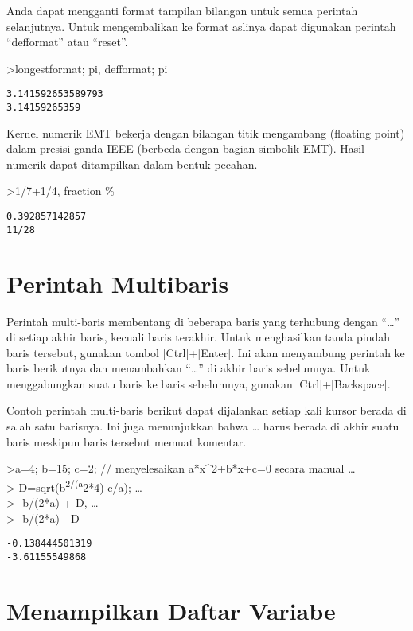 \documentclass[
]{book}
\begin{document}
Anda dapat mengganti format tampilan bilangan untuk semua perintah selanjutnya. Untuk mengembalikan ke format aslinya dapat digunakan perintah ``defformat'' atau ``reset''.

\textgreater longestformat; pi, defformat; pi

\begin{verbatim}
3.141592653589793
3.14159265359
\end{verbatim}

Kernel numerik EMT bekerja dengan bilangan titik mengambang (floating point) dalam presisi ganda IEEE (berbeda dengan bagian simbolik EMT). Hasil numerik dapat ditampilkan dalam bentuk pecahan.

\textgreater1/7+1/4, fraction \%

\begin{verbatim}
0.392857142857
11/28
\end{verbatim}

\chapter{Perintah Multibaris}\label{perintah-multibaris}

Perintah multi-baris membentang di beberapa baris yang terhubung dengan ``\ldots{}'' di setiap akhir baris, kecuali baris terakhir. Untuk menghasilkan tanda pindah baris tersebut, gunakan tombol {[}Ctrl{]}+{[}Enter{]}. Ini akan menyambung perintah ke baris berikutnya dan menambahkan ``\ldots{}'' di akhir baris sebelumnya. Untuk menggabungkan suatu baris ke baris sebelumnya, gunakan {[}Ctrl{]}+{[}Backspace{]}.

Contoh perintah multi-baris berikut dapat dijalankan setiap kali kursor berada di salah satu barisnya. Ini juga menunjukkan bahwa \ldots{} harus berada di akhir suatu baris meskipun baris tersebut memuat komentar.

\textgreater a=4; b=15; c=2; // menyelesaikan a*x\^{}2+b*x+c=0 secara manual \ldots{}\\
\textgreater{} D=sqrt(b\textsuperscript{2/(a}2*4)-c/a); \ldots{}\\
\textgreater{} -b/(2*a) + D, \ldots{}\\
\textgreater{} -b/(2*a) - D

\begin{verbatim}
-0.138444501319
-3.61155549868
\end{verbatim}

\chapter{Menampilkan Daftar Variabe}\label{menampilkan-daftar-variabe}
\end{document}
